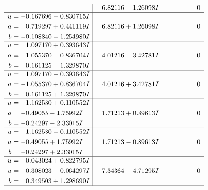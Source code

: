 \documentclass[1p]{elsarticle_modified}
\theoremstyle{definition}
\begin{document}
$$\begin{array}{c|c|c}
 & \phantom{-}6.82116 - 1.26098 I & \phantom{-0.000000 } 0 \\ \hline\begin{aligned}
u &= -0.167696 - 0.830715 I \\
a &= \phantom{-}0.719297 + 0.441119 I \\
b &= -0.108840 - 1.254980 I\end{aligned}
 & \phantom{-}6.82116 + 1.26098 I & \phantom{-0.000000 } 0 \\ \hline\begin{aligned}
u &= \phantom{-}1.097170 + 0.393643 I \\
a &= -1.055370 - 0.836704 I \\
b &= -0.161125 - 1.329870 I\end{aligned}
 & \phantom{-}4.01216 - 3.42781 I & \phantom{-0.000000 } 0 \\ \hline\begin{aligned}
u &= \phantom{-}1.097170 - 0.393643 I \\
a &= -1.055370 + 0.836704 I \\
b &= -0.161125 + 1.329870 I\end{aligned}
 & \phantom{-}4.01216 + 3.42781 I & \phantom{-0.000000 } 0 \\ \hline\begin{aligned}
u &= \phantom{-}1.162530 + 0.110552 I \\
a &= -0.49055 - 1.75992 I \\
b &= -0.24297 - 2.33015 I\end{aligned}
 & \phantom{-}1.71213 + 0.89613 I & \phantom{-0.000000 } 0 \\ \hline\begin{aligned}
u &= \phantom{-}1.162530 - 0.110552 I \\
a &= -0.49055 + 1.75992 I \\
b &= -0.24297 + 2.33015 I\end{aligned}
 & \phantom{-}1.71213 - 0.89613 I & \phantom{-0.000000 } 0 \\ \hline\begin{aligned}
u &= \phantom{-}0.043024 + 0.822795 I \\
a &= \phantom{-}0.308023 - 0.064297 I \\
b &= \phantom{-}0.349503 + 1.298690 I\end{aligned}
 & \phantom{-}7.34364 - 4.71295 I & \phantom{-0.000000 } 0\\
 \hline 
 \end{array}$$\newpage$$\begin{array}{c|c|c}  

\end{array}$$
\end{document}
